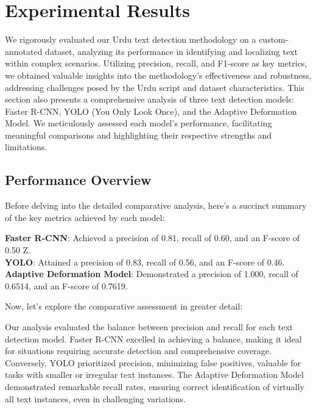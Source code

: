 \documentclass[default,iicol]{sn-jnl}%
\begin{document}
\section{Experimental Results}
We rigorously evaluated our Urdu text detection methodology on a custom-annotated dataset, analyzing its performance in identifying and localizing text within complex scenarios. Utilizing precision, recall, and F1-score as key metrics, we obtained valuable insights into the methodology's effectiveness and robustness, addressing challenges posed by the Urdu script and dataset characteristics. This section also presents a comprehensive analysis of three text detection models: Faster R-CNN, YOLO (You Only Look Once), and the Adaptive Deformation Model. We meticulously assessed each model's performance, facilitating meaningful comparisons and highlighting their respective strengths and limitations.


\subsection{Performance Overview}

Before delving into the detailed comparative analysis, here's a succinct summary of the key metrics achieved by each model:

\textbf{Faster R-CNN}: Achieved a precision of 0.81, recall of 0.60, and an F-score of 0.50
Z. \\
\textbf{YOLO}: Attained a precision of 0.83, recall of 0.56, and an F-score of 0.46. \\
\textbf{Adaptive Deformation Model}: Demonstrated a precision of 1.000, recall of 0.6514, and an F-score of 0.7619.

Now, let's explore the comparative assessment in greater detail:

Our analysis evaluated the balance between precision and recall for each text detection model. Faster R-CNN excelled in achieving a balance, making it ideal for situations requiring accurate detection and comprehensive coverage. Conversely, YOLO prioritized precision, minimizing false positives, valuable for tasks with smaller or irregular text instances. The Adaptive Deformation Model demonstrated remarkable recall rates, ensuring correct identification of virtually all text instances, even in challenging variations.
\end{document}
